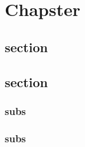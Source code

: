 \documentclass[fleqn,10pt]{book}  %
\begin{document}
\chapter{Chapster}

\blindtext[1]

\section{section}
\section{section}

\subsection{subs}
\subsection{subs}
\blindtext[1]
\end{document}
